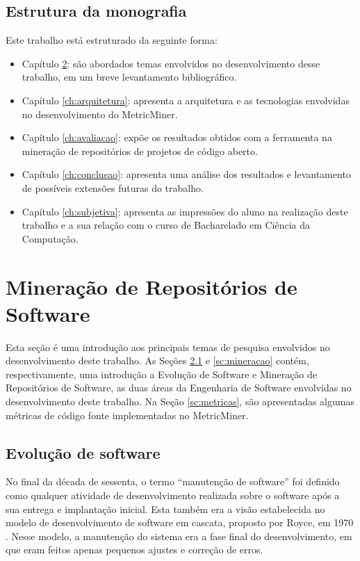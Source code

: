 \documentclass[a4paper, 12pt, twoside]{book}
\begin{document}
    \section{Estrutura da monografia}
        Este trabalho está estruturado da seguinte forma: 
        \begin{itemize}
            \item Capítulo \ref{ch:conceitos}: são abordados temas 
                envolvidos no desenvolvimento desse trabalho, em um breve levantamento bibliográfico.
            \item Capítulo \ref{ch:arquitetura}: apresenta a arquitetura e as tecnologias
            envolvidas no desenvolvimento do MetricMiner.
            \item Capítulo \ref{ch:avaliacao}: expõe os resultados obtidos com a ferramenta 
                na mineração de repositórios de projetos de código aberto.
            \item Capítulo \ref{ch:conclusao}: apresenta uma análise dos resultados e levantamento 
                de possíveis extensões futuras do trabalho.
            \item Capítulo \ref{ch:subjetiva}: apresenta as impressões do aluno na realização 
                deste trabalho e a sua relação com o curso de Bacharelado em Ciência da Computação.
        \end{itemize}
    
\chapter{Mineração de Repositórios de Software} \label{ch:conceitos}
    Esta seção é uma introdução aos principais temas de pesquisa envolvidos no desenvolvimento
    deste trabalho. As Seções \ref{sc:evolucao} e \ref{sc:mineracao} contém, respectivamente, 
    uma introdução a Evolução de Software e Mineração de Repositórios de Software, as duas áreas 
    da Engenharia de Software envolvidas no desenvolvimento deste trabalho. Na Seção 
    \ref{sc:metricas}, são apresentadas algumas métricas de código fonte implementadas no 
    MetricMiner. 

    \section{Evolução de software} \label{sc:evolucao}
        No final da década de sessenta, o termo ``manutenção de software'' foi definido 
        como qualquer atividade de desenvolvimento realizada sobre o software após a sua
        entrega e implantação inicial. Esta também era a visão estabelecida no modelo de
        desenvolvimento de software em cascata, proposto por Royce, em 1970 
        \cite{DBLP:series/springer/Mens08}. Nesse modelo, a manutenção do sistema era a fase final do 
        desenvolvimento, em que eram feitos apenas pequenos ajustes e correção de erros.
        
\end{document}
